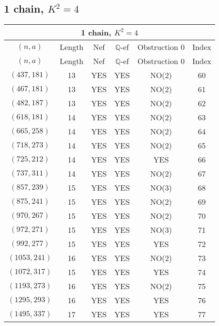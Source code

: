 \subsection{1 chain, $K^2 = 4$}
\begin{longtable}{|c|c|c|c|c|c|}
\hline
\multicolumn{6}{|c|}{1 chain, $K^2 = 4$}\\
\hline
$(n,a)$ & Length & Nef & $\mathbb Q$-ef & Obstruction 0 & Index\\
\hline
\endfirsthead

\hline
$(n,a)$ & Length & Nef & $\mathbb Q$-ef & Obstruction 0 & Index\\
\hline
\endhead
\hline
\endfoot

$(437, 181)$ & 13 & YES & YES & NO(2) & 60\\
$(467, 181)$ & 13 & YES & YES & NO(2) & 61\\
$(482, 187)$ & 13 & YES & YES & NO(2) & 62\\
$(618, 181)$ & 14 & YES & YES & NO(2) & 63\\
$(665, 258)$ & 14 & YES & YES & NO(2) & 64\\
$(718, 273)$ & 14 & YES & YES & NO(2) & 65\\
$(725, 212)$ & 14 & YES & YES & YES & 66\\
$(737, 311)$ & 14 & YES & YES & NO(2) & 67\\
$(857, 239)$ & 15 & YES & YES & NO(3) & 68\\
$(875, 241)$ & 15 & YES & YES & NO(2) & 69\\
$(970, 267)$ & 15 & YES & YES & NO(2) & 70\\
$(972, 271)$ & 15 & YES & YES & NO(3) & 71\\
$(992, 277)$ & 15 & YES & YES & YES & 72\\
$(1053, 241)$ & 16 & YES & YES & NO(2) & 73\\
$(1072, 317)$ & 15 & YES & YES & YES & 74\\
$(1193, 273)$ & 16 & YES & YES & NO(2) & 75\\
$(1295, 293)$ & 16 & YES & YES & YES & 76\\
$(1495, 337)$ & 17 & YES & YES & YES & 77
\end{longtable}
